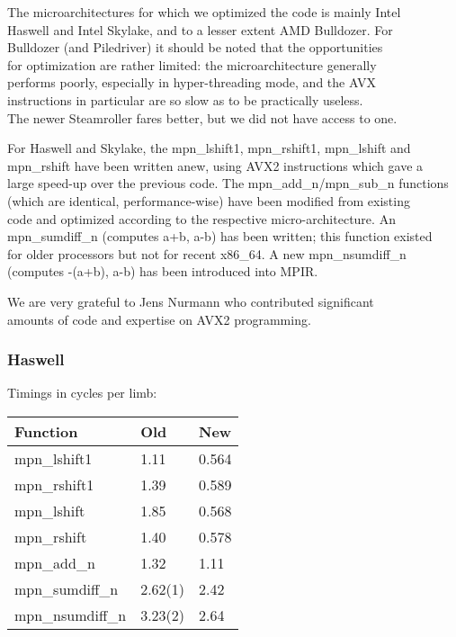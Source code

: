 The microarchitectures for which we optimized the code is mainly Intel\\
Haswell and Intel Skylake, and to a lesser extent AMD Bulldozer. For\\
Bulldozer (and Piledriver) it should be noted that the opportunities\\
for optimization are rather limited: the microarchitecture generally\\
performs poorly, especially in hyper-threading mode, and the AVX\\
instructions in particular are so slow as to be practically useless.\\
The newer Steamroller fares better, but we did not have access to one.

For Haswell and Skylake, the mpn\_lshift1, mpn\_rshift1, mpn\_lshift
and\\
mpn\_rshift have been written anew, using AVX2 instructions which gave
a\\
large speed-up over the previous code. The mpn\_add\_n/mpn\_sub\_n
functions\\
(which are identical, performance-wise) have been modified from
existing\\
code and optimized according to the respective micro-architecture. An\\
mpn\_sumdiff\_n (computes a+b, a-b) has been written; this function
existed\\
for older processors but not for recent x86\_64. A new
mpn\_nsumdiff\_n\\
(computes -(a+b), a-b) has been introduced into MPIR.

We are very grateful to Jens Nurmann who contributed significant\\
amounts of code and expertise on AVX2 programming.

\subsubsection{Haswell}\label{haswell}

Timings in cycles per limb:

\begin{longtable}[c]{@{}lll@{}}
\toprule
Function & Old & New\tabularnewline
\midrule
\endhead
mpn\_lshift1 & 1.11 & 0.564\tabularnewline
mpn\_rshift1 & 1.39 & 0.589\tabularnewline
mpn\_lshift & 1.85 & 0.568\tabularnewline
mpn\_rshift & 1.40 & 0.578\tabularnewline
mpn\_add\_n & 1.32 & 1.11\tabularnewline
mpn\_sumdiff\_n & 2.62(1) & 2.42\tabularnewline
mpn\_nsumdiff\_n & 3.23(2) & 2.64\tabularnewline
\bottomrule
\end{longtable}

